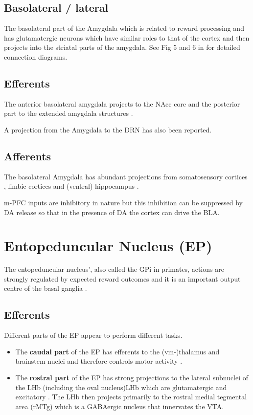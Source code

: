 \documentclass[12pt,a4paper]{article}
\begin{document}
\subsection{Basolateral / lateral}
The basolateral part of the Amygdala which is related to reward
processing and has glutamatergic neurons which have similar roles to
that of the cortex and then projects into the striatal parts of the
amygdala. See Fig 5 and 6 in \citet{Swanson1998} for detailed
connection diagrams.

\subsection{Efferents}
The anterior basolateral amygdala projects to the NAcc core and the
posterior part to the extended amygdala structures \citep{Alheid2003}.

A projection from the Amygdala to the DRN \citep{PollakDorocic2014}
has also been reported.

\subsection{Afferents}
The basolateral Amygdala has abundant projections from somatosensory
cortices \citep{Swanson1998}, limbic cortices \citep{Ottersen1982} and
(ventral) hippocampus \citep{Pitkanen2000}.

m-PFC inputs are inhibitory in nature \citep{Rosenkranz2002} but this
inhibition can be suppressed by DA release so that in the presence of
DA the cortex can drive the BLA.






\section{Entopeduncular Nucleus (EP)}
The entopeduncular nucleus’, also called the GPi in primates, actions
are strongly regulated by expected reward outcomes and it is an
important output centre of the basal ganglia \citep{Rajakumar1993}.

\subsection{Efferents}
Different parts of the EP appear to perform different tasks. 

\begin{itemize}
  \item The \textbf{caudal part} of the EP has efferents to the (vm-)thalamus
    and brainstem nuclei and therefore controls motor activity
    \citep{Rajakumar1993} \citep{Wallace2017}.
  \item The \textbf{rostral part} of the EP has strong projections to the
    lateral subnuclei of the LHb (including the oval nucleus)LHb
    \citep{Rajakumar1993, Hong2008} which are glutamatergic and
    excitatory \citep{Shabel2012, Wallace2017}. The LHb then
    projects primarily to the rostral medial tegmental area (rMTg)
    which is a GABAergic nucleus that innervates the VTA.
\end{itemize}
\end{document}

